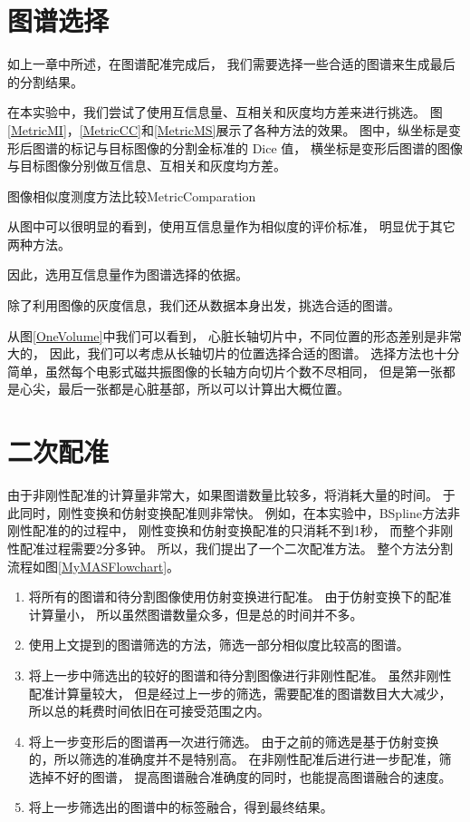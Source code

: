 \section{图谱选择}
如上一章中所述，在图谱配准完成后，
我们需要选择一些合适的图谱来生成最后的分割结果。

在本实验中，我们尝试了使用互信息量、互相关和灰度均方差来进行挑选。
图\ref{MetricMI}，\ref{MetricCC}和\ref{MetricMS}展示了各种方法的效果。
图中，纵坐标是变形后图谱的标记与目标图像的分割金标准的 Dice 值，
横坐标是变形后图谱的图像与目标图像分别做互信息、互相关和灰度均方差。
\begin{pics}[htpb]{图像相似度测度方法比较}{MetricComparation}
\end{pics}

从图中可以很明显的看到，使用互信息量作为相似度的评价标准，
明显优于其它两种方法。

因此，选用互信息量作为图谱选择的依据。

除了利用图像的灰度信息，我们还从数据本身出发，挑选合适的图谱。

从图\ref{OneVolume}中我们可以看到，
心脏长轴切片中，不同位置的形态差别是非常大的，
因此，我们可以考虑从长轴切片的位置选择合适的图谱。
选择方法也十分简单，虽然每个电影式磁共振图像的长轴方向切片个数不尽相同，
但是第一张都是心尖，最后一张都是心脏基部，所以可以计算出大概位置。


\section{二次配准}
由于非刚性配准的计算量非常大，如果图谱数量比较多，将消耗大量的时间。
于此同时，刚性变换和仿射变换配准则非常快。
例如，在本实验中，BSpline方法非刚性配准的的过程中，
刚性变换和仿射变换配准的只消耗不到1秒，
而整个非刚性配准过程需要2分多钟。
所以，我们提出了一个二次配准方法。
整个方法分割流程如图\ref{MyMASFlowchart}。
\begin{enumerate}
  \item 将所有的图谱和待分割图像使用仿射变换进行配准。
    由于仿射变换下的配准计算量小，
    所以虽然图谱数量众多，但是总的时间并不多。
  \item 使用上文提到的图谱筛选的方法，筛选一部分相似度比较高的图谱。
  \item 将上一步中筛选出的较好的图谱和待分割图像进行非刚性配准。
    虽然非刚性配准计算量较大，
    但是经过上一步的筛选，需要配准的图谱数目大大减少，
    所以总的耗费时间依旧在可接受范围之内。
  \item 将上一步变形后的图谱再一次进行筛选。
    由于之前的筛选是基于仿射变换的，所以筛选的准确度并不是特别高。
    在非刚性配准后进行进一步配准，筛选掉不好的图谱，
    提高图谱融合准确度的同时，也能提高图谱融合的速度。
  \item 将上一步筛选出的图谱中的标签融合，得到最终结果。
\end{enumerate}


